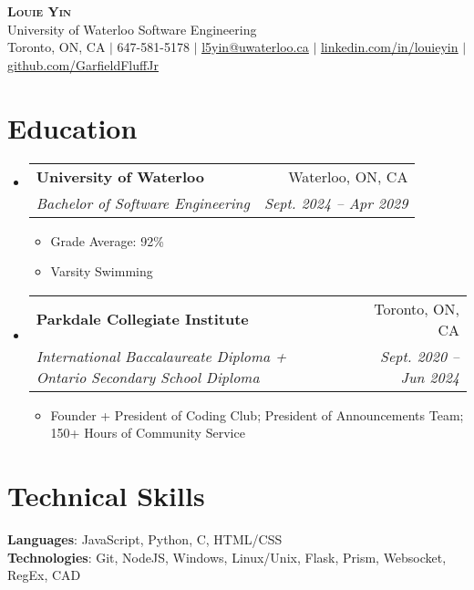 \documentclass[letterpaper,11pt]{article}
\makeatletter
\newcommand{\resumeItem}[1]{
  \item\small{
    {#1 \vspace{0pt}}
  }
}
\newcommand{\resumeSubheading}[4]{
  \vspace{-2pt}\item
    \begin{tabular*}{0.97\textwidth}[t]{l@{\extracolsep{\fill}}r}
      \textbf{#1} & #2 \\
      \textit{\small#3} & \textit{\small #4} \\
    \end{tabular*}\vspace{-7pt}
}
\newcommand{\resumeSubHeadingListStart}{\begin{itemize}[leftmargin=0.15in, label={}]}
\newcommand{\resumeSubHeadingListEnd}{\end{itemize}}
\newcommand{\resumeItemListStart}{\begin{itemize}}
\newcommand{\resumeItemListEnd}{\end{itemize}\vspace{-8pt}}
\makeatother
\begin{document}

\begin{center}
    \textbf{\Huge \scshape Louie Yin} \\
    \Large University of Waterloo Software Engineering \\ \vspace{3pt}
    \small Toronto, ON, CA $|$
    \small 647-581-5178 $|$ \href{mailto:l5yin@uwaterloo.ca}{\underline{l5yin@uwaterloo.ca}} $|$ 
    \href{https://www.linkedin.com/in/louieyin/}{\underline{linkedin.com/in/louieyin}} $|$
    \href{https://github.com/GarfieldFluffJr}{\underline{github.com/GarfieldFluffJr}}
\end{center}

\vspace{-12pt}


\section{Education}
  \resumeSubHeadingListStart
    \resumeSubheading
      {University of Waterloo}{Waterloo, ON, CA}
      {Bachelor of Software Engineering}{Sept. 2024 -- Apr 2029}
      \resumeItemListStart
        \resumeItem{Grade Average: 92\%}
        \vspace{-2pt}
        \resumeItem{Varsity Swimming}
        \vspace{-2pt}
      \resumeItemListEnd
    \resumeSubheading
      {Parkdale Collegiate Institute}{Toronto, ON, CA}
      {International Baccalaureate Diploma + Ontario Secondary School Diploma}{Sept. 2020 -- Jun 2024}
    \resumeItemListStart
      \resumeItem{Founder + President of Coding Club; President of Announcements Team; 150+ Hours of Community Service}
      \vspace{-2pt}
    \resumeItemListEnd
  \resumeSubHeadingListEnd


\section{Technical Skills}
 \begin{itemize}[leftmargin=0.15in, label={}]
    \small{\item{
     \textbf{Languages}{: JavaScript, Python, C, HTML/CSS} \\
     \textbf{Technologies}{: Git, NodeJS, Windows, Linux/Unix, Flask, Prism, Websocket, RegEx, CAD} \\
    }}
 \end{itemize}
\end{document}
